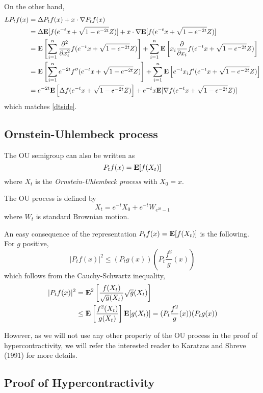 \documentclass[11pt]{article}
\begin{document}
On the other hand,
\begin{align}
LP_t f(x) &= \Delta P_t f(x) + x \cdot \nabla P_t f(x)
\\&= \Delta \textbf{E}[f(e^{-t}x + \sqrt{1-e^{-2t}}Z)] + x \cdot
\nabla \textbf{E}[f(e^{-t}x + \sqrt{1-e^{-2t}}Z)]
\\&= \textbf{E}\left[\sum_{i=1}^n \frac{\partial^2}{\partial x_i^2}
  f(e^{-t}x + \sqrt{1-e^{-2t}}Z)\right] + \sum_{i=1}^n \textbf{E}\left[x_i
\frac{\partial}{\partial x_i}f(e^{-t}x + \sqrt{1-e^{-2t}}Z)\right]
\\&= \textbf{E}\left[\sum_{i=1}^n e^{-2t} f''(e^{-t}x +
  \sqrt{1-e^{-2t}}Z)\right] + \sum_{i=1}^n \textbf{E}\left[e^{-t} x_i f'(e^{-t}x + \sqrt{1-e^{-2t}}Z)\right]
\\&= e^{-2t} \textbf{E}\left[\Delta f(e^{-t}x
  +\sqrt{1-e^{-2t}}Z)\right] + 
e^{-t}x\textbf{E}[\nabla f(e^{-t}x + \sqrt{1-e^{-2t}}Z)]
\end{align}
which matches \eqref{dtside}.

\subsection{Ornstein-Uhlembeck process}

The OU semigroup can also be written as
\[
P_t f(x) = \textbf{E}[f(X_t)]
\]
where $X_t$ is the \emph{Ornstein-Uhlembeck process} with $X_0 = x$.

The OU process is defined by
\[
X_t = e^{-t} X_0 + e^{-t} W_{e^{2t}-1}
\]
where $W_t$ is standard Brownian motion.

An easy consequence of the representation $P_t f(x) =
\textbf{E}[f(X_t)]$ is the following.
For $g$ positive,
\begin{equation}\label{csstep}
|P_t f(x)|^2 \leq (P_t g (x)) (P_t \frac{f^2}{g}(x))
\end{equation}
which follows from the Cauchy-Schwartz inequality,
\begin{align}
|P_t f(x)|^2 &= \textbf{E}^2\left[\frac{f(X_t)}{\sqrt{g}(X_t)} \sqrt{g}(X_t)\right]
\\&\leq \textbf{E}\left[ \frac{f^2(X_t)}{g(X_t)}\right] \textbf{E}[g(X_t)] = (P_t \frac{f^2}{g}(x))(P_t g (x))
\end{align}

However, as we will not use any other property of the OU process in the proof of
hypercontractivity, we will refer the interested reader to Karatzas
and Shreve (1991) for more details.

\subsection{Proof of Hypercontractivity}
\end{document}
